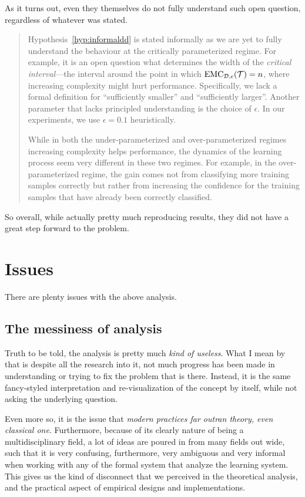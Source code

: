 As it turns out, even they themselves do not fully understand such open question, regardless of whatever was stated. 
\begin{quote}
    Hypothesis~\ref{hyp:informaldd} is stated informally
as we are yet to fully understand the behaviour at the critically parameterized regime.
For example, it is an open question what determines the width of the \emph{critical interval}---the interval around the point  in which $\mathrm{EMC}_{\mathcal{D},\epsilon}(\mathcal{T}) = n$, where increasing complexity might hurt performance. Specifically, we lack a formal definition for ``sufficiently smaller'' and ``sufficiently larger''. Another parameter that lacks principled understanding is the choice of $\epsilon$. In our experiments, we use $\epsilon=0.1$ heuristically.

While in both the under-parameterized and over-parameterized regimes increasing complexity helps performance, the dynamics of the learning process seem very different in these two regimes.
For example, in the over-parameterized regime, the gain comes not from classifying more training samples correctly but rather from increasing the confidence for the training samples that have already been correctly classified. 
\end{quote}
So overall, while actually pretty much reproducing results, they did not have a great step forward to the problem.

\section{Issues}

There are plenty issues with the above analysis. 
\subsection{The messiness of analysis}

Truth to be told, the analysis is pretty much \textit{kind of useless}. What I mean by that is despite all the research into it, not much progress has been made in understanding or trying to fix the problem that is there. Instead, it is the same fancy-styled interpretation and re-visualization of the concept by itself, while not asking the underlying question. 

Even more so, it is the issue that \textit{modern practices far outran theory, even classical one}. Furthermore, because of its clearly nature of being a multidisciplinary field, a lot of ideas are poured in from many fields out wide, such that it is very confusing, furthermore, very ambiguous and very informal when working with any of the formal system that analyze the learning system. This gives us the kind of disconnect that we perceived in the theoretical analysis, and the practical aspect of empirical designs and implementations. 

